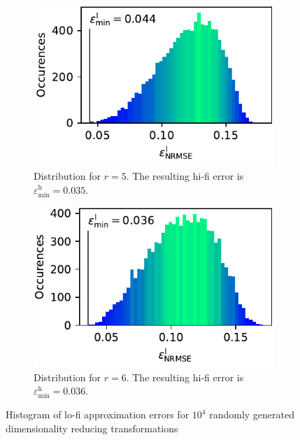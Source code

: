 \documentclass[
  a4paper,  %
  twoside,  %
  bibliography=totoc,
  headsepline,
  cleardoublepage=empty,
  parskip=half,
  draft=false
]{scrbook}
\begin{document}
\begin{mdframed}[style=style]
\vspace{2mm}
\begin{figure}[H]
  \centering
\begin{subfigure}{.5\textwidth}
  \centering
   \includegraphics[width=\linewidth]{graphics/ww_hist_5}
  \caption{Distribution for $r=5$. The resulting hi-fi error is $\varepsilon^\mathrm{h}_{\mathrm{min}}=0.035$.}
\vspace{3mm}
\label{fig:ishigami_hist_2}
\end{subfigure}%
\begin{subfigure}{.5\textwidth}
  \centering
   \includegraphics[width=\linewidth]{graphics/ww_hist_6}
  \caption{Distribution for $r=6$. The resulting hi-fi error is $\varepsilon^\mathrm{h}_{\mathrm{min}}=0.036$.}
\vspace{3mm}
\label{fig:ishigami_hist_1}
\end{subfigure}
\delimit
\caption{Histogram of lo-fi approximation errors for $10^4$ randomly generated dimensionality reducing transformations}
\label{fig:ishigami_hist_12}
\end{figure}
\end{mdframed}
\end{document}
